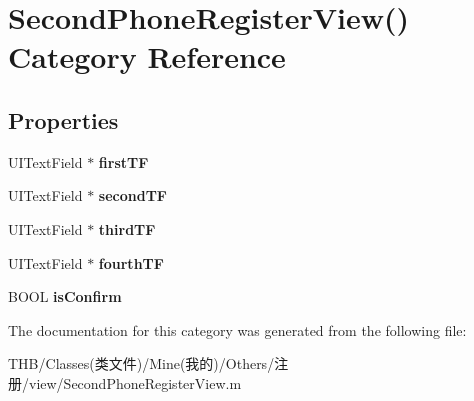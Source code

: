 \hypertarget{category_second_phone_register_view_07_08}{}\section{Second\+Phone\+Register\+View() Category Reference}
\label{category_second_phone_register_view_07_08}
\subsection*{Properties}
\begin{DoxyCompactItemize}
\item 
\mbox{\label{category_second_phone_register_view_07_08_aa352ff4e62264a1e3a25a2c5af2f195c}} 
U\+I\+Text\+Field $\ast$ {\bfseries first\+TF}
\item 
\mbox{\label{category_second_phone_register_view_07_08_a64e2df8ae5b3f62188d7fcba98fba521}} 
U\+I\+Text\+Field $\ast$ {\bfseries second\+TF}
\item 
\mbox{\label{category_second_phone_register_view_07_08_abc57c49237e447a866b23c631cf77b51}} 
U\+I\+Text\+Field $\ast$ {\bfseries third\+TF}
\item 
\mbox{\label{category_second_phone_register_view_07_08_aa40fd3acfb6ad8b7820b9deb9d303cdc}} 
U\+I\+Text\+Field $\ast$ {\bfseries fourth\+TF}
\item 
\mbox{\label{category_second_phone_register_view_07_08_aa1f3a5cd6efa939421073282ded1340d}} 
B\+O\+OL {\bfseries is\+Confirm}
\end{DoxyCompactItemize}


The documentation for this category was generated from the following file\+:\begin{DoxyCompactItemize}
\item 
T\+H\+B/\+Classes(类文件)/\+Mine(我的)/\+Others/注册/view/Second\+Phone\+Register\+View.\+m\end{DoxyCompactItemize}
